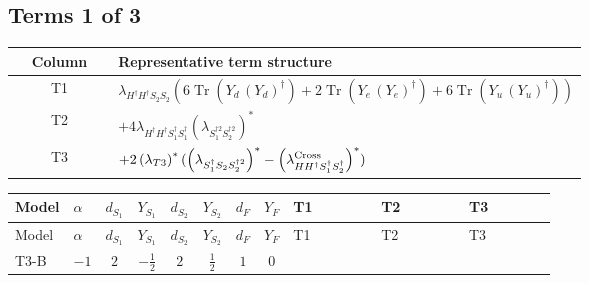 \documentclass[8pt]{article}
\begin{document}
\begin{landscape}
\subsection*{Terms 1 of 3}
\begin{center}
\begin{tabular}{@{}c >{\raggedright\arraybackslash}p{0.82\linewidth}@{}}
\toprule
Column & Representative term structure \\
\midrule
T1 & \(\displaystyle {\lambda_{H^\dagger H^\dagger S_2 S_2}} (6 \operatorname{Tr}\!\left({Y_d}\,\left({Y_d}\right)^{\dagger}\right)+2 \operatorname{Tr}\!\left({Y_e}\,\left({Y_e}\right)^{\dagger}\right)+6 \operatorname{Tr}\!\left({Y_u}\,\left({Y_u}\right)^{\dagger}\right))\) \\
\midrule
T2 & \(\displaystyle +4 {\lambda_{H^\dagger H^\dagger S_1^\dagger S_1^\dagger}} \left({\lambda_{S_1^{\dagger 2}S_2^{\dagger 2}}}\right)^{*}\) \\
\midrule
T3 & \(\displaystyle +2 \left({\lambda_{T3}}\right)^{*} (\left({\lambda_{S_1^\dagger S_2 S_2^{\dagger 2}}}\right)^{*}-\left({\lambda_{H H^\dagger S_1^\dagger S_2^\dagger}^{\rm Cross}}\right)^{*})\) \\
\midrule
\bottomrule
\end{tabular}
\end{center}
\smallskip
\tiny
\begin{longtable}{@{}llcccccc >{\raggedright\arraybackslash}p{0.21\linewidth} >{\raggedright\arraybackslash}p{0.21\linewidth} >{\raggedright\arraybackslash}p{0.21\linewidth}@{}}
\toprule
Model & $\alpha$ & $d_{S_1}$ & $Y_{S_1}$ & $d_{S_2}$ & $Y_{S_2}$ & $d_F$ & $Y_F$ & T1 & T2 & T3 \\
\midrule
\endfirsthead
\toprule
Model & $\alpha$ & $d_{S_1}$ & $Y_{S_1}$ & $d_{S_2}$ & $Y_{S_2}$ & $d_F$ & $Y_F$ & T1 & T2 & T3 \\
\midrule
\endhead
T3-B & $-1$ & $2$ & $-\frac{1}{2}$ & $2$ & $\frac{1}{2}$ & $1$ & $0$ & \scriptsize\adjustbox{max width=\linewidth}{$\begin{gathered} {\lambda_{H^\dagger H^\dagger S_2 S_2}} (6 \operatorname{Tr}\!\left({Y_d}\,\left({Y_d}\right)^{\dagger}\right)+2 \operatorname{Tr}\!\left({Y_e}\,\left({Y_e}\right)^{\dagger}\right)+6 \operatorname{Tr}\!\left({Y_u}\,\left({Y_u}\right)^{\dagger}\right))\end{gathered}$} & \scriptsize\adjustbox{max width=\linewidth}{$\begin{gathered} +4 {\lambda_{H^\dagger H^\dagger S_1^\dagger S_1^\dagger}} \left({\lambda_{S_1^{\dagger 2}S_2^{\dagger 2}}}\right)^{*}\end{gathered}$} & \scriptsize\adjustbox{max width=\linewidth}{$\begin{gathered} +2 \left({\lambda_{T3}}\right)^{*} (\left({\lambda_{S_1^\dagger S_2 S_2^{\dagger 2}}}\right)^{*}-\left({\lambda_{H H^\dagger S_1^\dagger S_2^\dagger}^{\rm Cross}}\right)^{*})\end{gathered}$} \\

\end{longtable}
\end{landscape}
\end{document}
